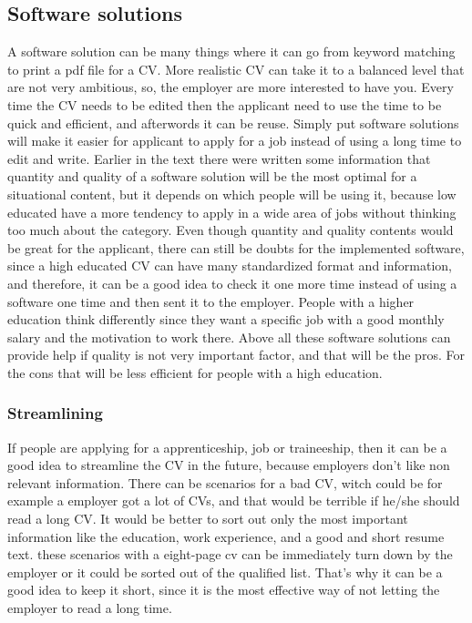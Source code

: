 \subsection{Software solutions}
A software solution can be many things where it can go from keyword matching to print a pdf file for a CV.
More realistic CV can take it to a balanced level that are not very ambitious, 
so, the employer are more interested to have you. Every time the CV needs to be edited
then the applicant need to use the time to be quick and efficient, and afterwords it can be reuse.
Simply put software solutions will make it easier for applicant to apply for a job instead of using a long time to edit and write. 
Earlier in the text there were written some information 
that quantity and quality of a software solution will be the most optimal for a situational content,
but it depends on which people will be using it, because low educated have a more tendency to apply
in a wide area of jobs without thinking too much about the category. 
Even though quantity and quality contents would be great for the applicant, 
there can still be doubts for the implemented software, since a high educated CV can have many standardized format and information,
and therefore, it can be a good idea to check it one more time instead of using a software one time and then sent it to the employer.
People with a higher education think differently since they want a specific job
with a good monthly salary and the motivation to work there. 
Above all these software solutions can provide help if quality is not very important factor,
and that will be the pros. For the cons that will be less efficient for people with a high education.


\subsubsection{Streamlining}
If people are applying for a apprenticeship, job or traineeship, 
then it can be a good idea to streamline the CV in the future, because employers don't like non relevant information.
There can be scenarios for a bad CV, witch could be for example a employer got a lot of CVs,
and that would be terrible if he/she should read a long CV. It would be better to sort out only the most important information 
like the education, work experience, and a good and short resume text. 
these scenarios with a eight-page cv can be immediately turn down by the employer or it could be sorted out of the qualified list.
That's why it can be a good idea to keep it short, since it is the most effective way of not letting the employer to read a long time.

